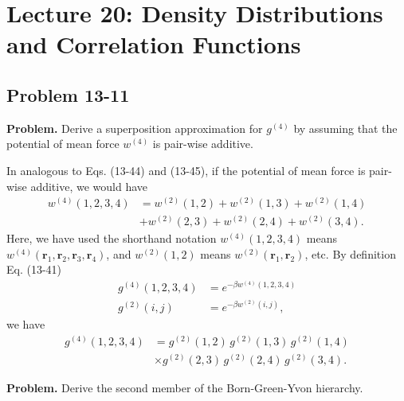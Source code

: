\documentclass[twocolumn, 10pt]{article}
\numberwithin{equation}{section}
\newenvironment{problem}
{\par\medskip \color{problue}
  \textbf{Problem. }\ignorespaces}
{\medskip}
\newenvironment{solution}[1][\empty]
{\par\medskip\sffamily
  \textbf{\ifx\empty#1{Solution.}\relax\else{#1}\fi} \ignorespaces}
{\medskip}
\begin{document}
\section{Lecture 20: Density Distributions and Correlation Functions}

\subsection{Problem 13-11}

\begin{problem}
  Derive a superposition approximation for $g^{(4)}$
  by assuming that the potential of mean force $w^{(4)}$
  is pair-wise additive.
\end{problem}

\begin{solution}
  In analogous to Eqs. (13-44) and (13-45),
  if the potential of mean force is pair-wise additive,
  we would have
  \begin{align*}
    w^{(4)}(1,2,3,4)
    &=
    w^{(2)}(1,2)
    +w^{(2)}(1,3)
    +w^{(2)}(1,4)
    \\
    &+w^{(2)}(2,3)
    +w^{(2)}(2,4)
    +w^{(2)}(3,4)
    .
  \end{align*}
  Here, we have used the shorthand notation
  $w^{(4)}(1, 2, 3, 4)$
  means
  $w^{(4)}(\mathbf r_1, \mathbf r_2, \mathbf r_3, \mathbf r_4)$,
  and
  $w^{(2)}(1, 2)$
  means
  $w^{(2)}(\mathbf r_1, \mathbf r_2)$,
  etc.
  By definition Eq. (13-41)
  \begin{align*}
    g^{(4)}(1, 2, 3, 4)
    &=
    e^{-\beta w^{(4)}(1, 2, 3, 4)}
    \\
    g^{(2)}(i, j)
    &=
    e^{-\beta w^{(2)}(i, j)}
    ,
  \end{align*}
  we have
  \begin{align*}
    g^{(4)}(1,2,3,4)
    &=
    g^{(2)}(1,2) \,
    g^{(2)}(1,3) \,
    g^{(2)}(1,4)
    \\
    &\times
    g^{(2)}(2,3) \,
    g^{(2)}(2,4) \,
    g^{(2)}(3,4)
    .
  \end{align*}
\end{solution}

\begin{problem}
  Derive the second member of the Born-Green-Yvon hierarchy.
\end{problem}
\end{document}
